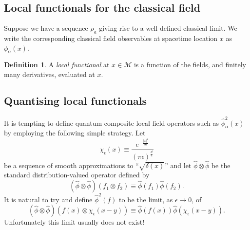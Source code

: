 \documentclass[prl,twocolumn,lengthcheck,superscriptaddress]{revtex4-1}
\theoremstyle{definition}
\newtheorem{definition}{Definition}
\theoremstyle{remark}
\begin{document}
\subsection{Local functionals for the classical field}
Suppose we have a sequence $\rho_a$ giving rise to a well-defined classical limit. We write the corresponding classical field observables at spacetime location $x$ as $\phi_\alpha(x)$. 
\begin{definition}
	A \emph{local functional} at $x\in \mathcal{M}$ is a function of the fields, and finitely many derivatives, evaluated at $x$.
\end{definition}

\subsection{Quantising local functionals}
It is tempting to define quantum composite local field operators such as $\widehat{\phi}^2_\alpha(x)$ by employing the following simple strategy. Let 
\begin{equation}
	\chi_\epsilon(x) \equiv \frac{e^{-\frac{|x|^2}{2\epsilon}}}{(\pi\epsilon)^{\frac{d}{4}}}
\end{equation}
be a sequence of smooth approximations to ``$\sqrt{\delta(x)}$'' and let $\widehat{\phi}\otimes \widehat{\phi}$ be the standard distribution-valued operator defined by
\begin{equation}
	(\widehat{\phi}\otimes \widehat{\phi})(f_1\otimes f_2) \equiv \widehat{\phi}(f_1) \widehat{\phi}(f_2).
\end{equation}
It is natural to try and define $\widehat{\phi}^2(f)$ to be the limit, as $\epsilon\rightarrow 0$, of 
\begin{equation}
	(\widehat{\phi}\otimes \widehat{\phi})(f(x)\otimes \chi_\epsilon(x-y)) \equiv \widehat{\phi}(f(x)) \widehat{\phi}(\chi_\epsilon(x-y)).
\end{equation}
Unfortunately this limit usually does not exist!
\end{document}
